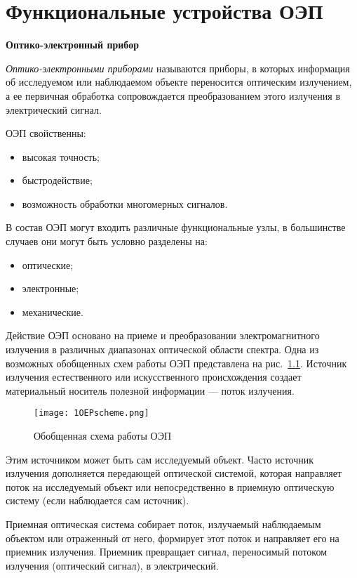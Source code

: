 \chapter{Функциональные устройства ОЭП}

\begin{flushleft}
	\textbf{Оптико-электронный прибор}
\end{flushleft}

\textit{Оптико-электронными приборами} называются приборы, в которых информация об исследуемом или наблюдаемом объекте переносится оптическим излучением, а ее первичная обработка сопровождается преобразованием этого излучения в электрический сигнал.

ОЭП свойственны:
\begin{itemize}
	\item высокая точность;
	\item быстродействие;
	\item возможность обработки многомерных сигналов.
\end{itemize}

В состав ОЭП могут входить различные функциональные узлы, в большинстве случаев они могут быть условно разделены на:
\begin{itemize}
	\item оптические;
	\item электронные;
	\item механические.
\end{itemize}

Действие ОЭП основано на приеме и преобразовании электромагнитного излучения в различных диапазонах оптической области спектра. Одна из возможных обобщенных схем работы ОЭП представлена на рис.~\ref{pic:1OEPscheme}. Источник излучения естественного или искусственного происхождения создает материальный носитель полезной информации --- поток излучения.

\begin{figure}[h!]
	\caption{Обобщенная схема работы ОЭП}
	\texttt{[image: 1OEPscheme.png]}
	\label{pic:1OEPscheme}
\end{figure}

Этим источником может быть сам исследуемый объект. Часто источник излучения дополняется передающей оптической системой, которая направляет поток на исследуемый объект или непосредственно в приемную оптическую систему (если наблюдается сам источник). 

Приемная оптическая система собирает поток, излучаемый наблюдаемым объектом или отраженный от него, формирует этот поток и направляет его на приемник излучения. Приемник превращает сигнал, переносимый потоком излучения (оптический сигнал), в электрический. 

